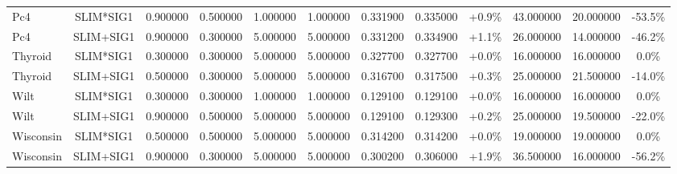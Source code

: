 \begin{table}[H]
\begin{tabular}{lccccccccccc}
Pc4 & SLIM*SIG1 & 0.900000 & 0.500000 & 1.000000 & 1.000000 & 0.331900 & 0.335000 & +0.9\% & 43.000000 & 20.000000 & -53.5\% \\
Pc4 & SLIM+SIG1 & 0.900000 & 0.300000 & 5.000000 & 5.000000 & 0.331200 & 0.334900 & +1.1\% & 26.000000 & 14.000000 & -46.2\% \\
Thyroid & SLIM*SIG1 & 0.300000 & 0.300000 & 5.000000 & 5.000000 & 0.327700 & 0.327700 & +0.0\% & 16.000000 & 16.000000 & 0.0\% \\
Thyroid & SLIM+SIG1 & 0.500000 & 0.300000 & 5.000000 & 5.000000 & 0.316700 & 0.317500 & +0.3\% & 25.000000 & 21.500000 & -14.0\% \\
Wilt & SLIM*SIG1 & 0.300000 & 0.300000 & 1.000000 & 1.000000 & 0.129100 & 0.129100 & +0.0\% & 16.000000 & 16.000000 & 0.0\% \\
Wilt & SLIM+SIG1 & 0.900000 & 0.500000 & 5.000000 & 5.000000 & 0.129100 & 0.129300 & +0.2\% & 25.000000 & 19.500000 & -22.0\% \\
Wisconsin & SLIM*SIG1 & 0.500000 & 0.500000 & 5.000000 & 5.000000 & 0.314200 & 0.314200 & +0.0\% & 19.000000 & 19.000000 & 0.0\% \\
Wisconsin & SLIM+SIG1 & 0.900000 & 0.300000 & 5.000000 & 5.000000 & 0.300200 & 0.306000 & +1.9\% & 36.500000 & 16.000000 & -56.2\% \\
\bottomrule
\end{tabular}

        
    \end{table}
    